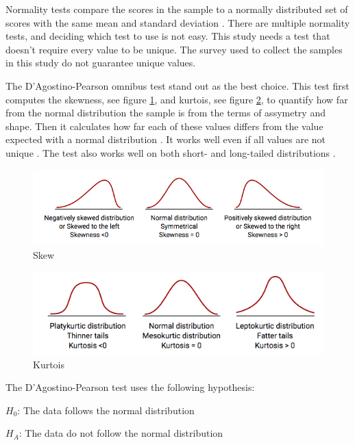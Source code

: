 Normality tests compare the scores in the sample to a normally distributed set of scores with the same mean and standard deviation \citep{Ghasemi2012}. There are multiple normality tests, and deciding which test to use is not easy. This study needs a test that doesn't require every value to be unique. The survey used to collect the samples in this study do not guarantee unique values. 

The D'Agostino-Pearson omnibus test stand out as the best choice. This test first computes the skewness, see figure \ref{fig:skew}, and kurtois, see figure \ref{fig:kurtois}, to quantify how far from the normal distribution the sample is from the terms of assymetry and shape. Then it calculates how far each of these values differs from the value expected with a normal distribution \citep{Pearson2006}. It works well even if all values are not unique \citep{Motulsky2013}. The test also works well on both short- and long-tailed distributions \citep{Yap2011}. \newline  %

\begin{figure}[h!]
	\centering
	\includegraphics[width=0.7\linewidth]{"fig/skew"}
	\caption{Skew \citep{MedCalcSoftwarebvba2017}}
	\label{fig:skew}
\end{figure}

\begin{figure}[h!]
	\centering
	\includegraphics[width=0.7\linewidth]{fig/kurtois}
	\caption{Kurtois \citep{MedCalcSoftwarebvba2017}}
	\label{fig:kurtois}
\end{figure}


The D'Agostino-Pearson test uses the following hypothesis:\newline

\centerline{$H_{0}$: The data follows the normal distribution} 
\centerline{$H_{A}$: The data do not follow the normal distribution}

